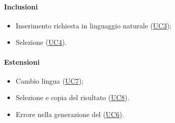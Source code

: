 \paragraph*{Inclusioni}
\begin{itemize}
  \item Inserimento richiesta in linguaggio naturale (\hyperref[UC3]{UC3});
  \item Selezione  (\hyperref[UC4]{UC4}).
\end{itemize}

\paragraph*{Estensioni}
\begin{itemize}
  \item Cambio lingua (\hyperref[UC7]{UC7});
  \item Selezione e copia del  risultato (\hyperref[UC8]{UC8}).
  \item Errore nella generazione del  (\hyperref[UC6]{UC6}).
\end{itemize}

